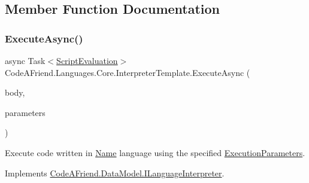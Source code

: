 \subsection{Member Function Documentation}
\mbox{\label{class_code_a_friend_1_1_languages_1_1_core_1_1_interpreter_template_ae2cf761e61f7b6b6fc553703ea3ba3c5}} 
\subsubsection{\texorpdfstring{Execute\+Async()}{ExecuteAsync()}}
{\footnotesize\ttfamily async Task$<$\mbox{\hyperlink{class_code_a_friend_1_1_data_model_1_1_script_evaluation}{Script\+Evaluation}}$>$ Code\+A\+Friend.\+Languages.\+Core.\+Interpreter\+Template.\+Execute\+Async (\begin{DoxyParamCaption}\item[{string}]{body,  }\item[{\mbox{\hyperlink{class_code_a_friend_1_1_data_model_1_1_execution_parameters}{Execution\+Parameters}}}]{parameters }\end{DoxyParamCaption})}



Execute code written in \mbox{\hyperlink{interface_code_a_friend_1_1_data_model_1_1_i_language_interpreter_ab8d4ee55278929fb59f3f015789aaa36}{Name}} language using the specified \mbox{\hyperlink{class_code_a_friend_1_1_data_model_1_1_execution_parameters}{Execution\+Parameters}}.  



Implements \mbox{\hyperlink{interface_code_a_friend_1_1_data_model_1_1_i_language_interpreter_a3003897aaa13ee672b6157c584e46898}{Code\+A\+Friend.\+Data\+Model.\+I\+Language\+Interpreter}}.

\mbox{\label{class_code_a_friend_1_1_languages_1_1_core_1_1_interpreter_template_a2f8560fba2e22a9cdf22c8d2f7bb849f}} 
